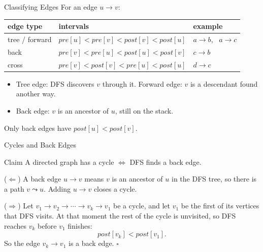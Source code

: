 \documentclass[10pt,aspectratio=169]{beamer}
\begin{document}
\begin{frame}{Classifying Edges}
  For an edge $u \to v$:

  \bigskip
  \begin{center}
  \begin{tabular}{lll}
    \toprule
    edge type & intervals & example \\
    \midrule
    \textcolor{mLightBlue}{tree} / \textcolor{mGreen}{forward}
      & $pre[u] < pre[v] < post[v] < post[u]$ & $a \to b$, \ $a \to c$ \\
    \textcolor{mRed}{back}
      & $pre[v] < pre[u] < post[u] < post[v]$ & $c \to b$ \\
    cross
      & $pre[v] < post[v] < pre[u] < post[u]$ & $d \to c$ \\
    \bottomrule
  \end{tabular}
  \end{center}

  \bigskip
  \begin{itemize}
    \item Tree edge: DFS discovers $v$ through it. Forward edge: $v$ is a
          descendant found another way.
    \item Back edge: $v$ is an \alert{ancestor} of $u$, still on the stack.
  \end{itemize}

  \pause
  \medskip
  \begin{alertblock}{}
    \centering Only back edges have $post[u] < post[v]$.
  \end{alertblock}
\end{frame}

\begin{frame}{Cycles and Back Edges}
  \begin{block}{Claim}
    A directed graph has a cycle $\iff$ DFS finds a back edge.
  \end{block}

  \medskip
  ($\Leftarrow$) A back edge $u \to v$ means $v$ is an ancestor of $u$ in the
  DFS tree, so there is a path $v \leadsto u$. Adding $u \to v$ closes a
  cycle.

  \pause
  \medskip
  ($\Rightarrow$) Let $v_1 \to v_2 \to \cdots \to v_k \to v_1$ be a cycle, and
  let $v_1$ be the first of its vertices that DFS visits. At that moment the
  rest of the cycle is unvisited, so DFS reaches $v_k$ \alert{before $v_1$
  finishes}:
  \[
    post[v_k] < post[v_1].
  \]
  So the edge $v_k \to v_1$ is a back edge. $\square$
\end{frame}
\end{document}
